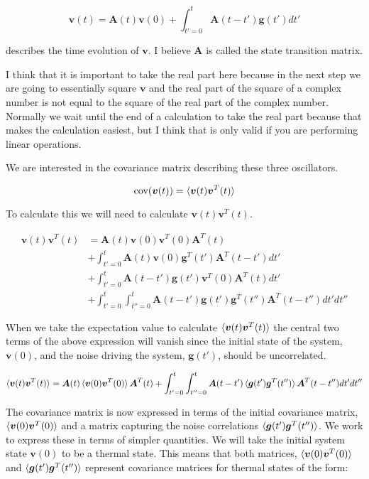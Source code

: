\documentclass[12pt]{article}
\newcommand{\bv}[1]{\boldsymbol{#1}}
\begin{document}
\begin{equation}
\bv{v}(t) = \bv{A}(t) \bv{v}(0) + \int_{t'=0}^t \bv{A}(t-t') \bv{g}(t') dt'
\end{equation}

describes the time evolution of $\bv{v}$. I believe $\bv{A}$ is called the state transition matrix.

I think that it is important to take the real part here because in the next step we are going to essentially square $\bv{v}$ and the real part of the square of a complex number is not equal to the square of the real part of the complex number. Normally we wait until the end of a calculation to take the real part because that makes the calculation easiest, but I think that is only valid if you are performing linear operations.

We are interested in the covariance matrix describing these three oscillators. 

\[
\text{cov}(\bv{v}(t)) = \braket{\bv{v}(t)\bv{v}^T(t)}
\]

To calculate this we will need to calculate $\bv{v}(t)\bv{v}^T(t)$.

\begin{align}
\bv{v}(t)\bv{v}^T(t) &= \bv{A}(t)\bv{v}(0)\bv{v}^T(0) \bv{A}^T(t)\\
&+\int_{t'=0}^{t}\bv{A}(t)\bv{v}(0) \bv{g}^T(t')\bv{A}^T(t-t')dt'\\
&+\int_{t'=0}^{t}\bv{A}(t-t')\bv{g}(t')\bv{v}^T(0)\bv{A}^T(t)dt'\\
&+ \int_{t'=0}^{t} \int_{t''=0}^{t} \bv{A}(t-t')\bv{g}(t')\bv{g}^T(t'')\bv{A}^T(t-t'') dt' dt''
\end{align}

When we take the expectation value to calculate $\braket{\bv{v}(t)\bv{v}^T(t)}$ the central two terms of the above expression will vanish since the initial state of the system, $\bv{v}(0)$, and the noise driving the system, $\bv{g}(t')$, should be uncorrelated.


\[
\braket{\bv{v}(t)\bv{v}^T(t)} = \bv{A}(t) \braket{\bv{v}(0)\bv{v}^T(0)}\bv{A}^T(t) + \int_{t'=0}^t \int_{t''=0}^t \bv{A}(t-t') \braket{\bv{g}(t')\bv{g}^T(t'')} \bv{A}^T(t-t'') dt' dt''
\]

The covariance matrix is now expressed in terms of the initial covariance matrix, $\braket{\bv{v}(0)\bv{v}^T(0)}$ and a matrix capturing the noise correlations $\braket{\bv{g}(t')\bv{g}^T(t'')}$. We work to express these in terms of simpler quantities. We will take the initial system state $\bv{v}(0)$ to be a thermal state. This means that both matrices,  $\braket{\bv{v}(0)\bv{v}^T(0)}$ and $\braket{\bv{g}(t')\bv{g}^T(t'')}$ represent covariance matrices for thermal states of the form:
\end{document}
